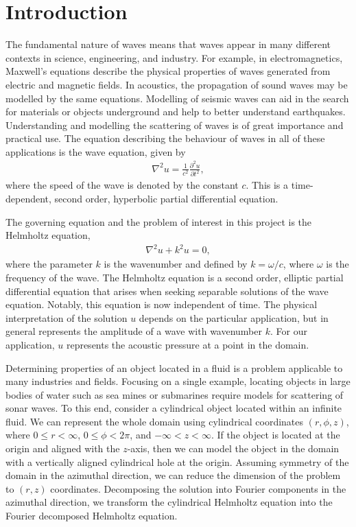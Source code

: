 \chapter{Introduction}


The fundamental nature of waves means that waves appear in many different contexts in science, engineering, and industry.
For example, in electromagnetics, Maxwell's equations describe the physical properties of waves generated from electric and magnetic fields.
In acoustics, the propagation of sound waves may be modelled by the same equations.
Modelling of seismic waves can aid in the search for materials or objects underground and help to better understand earthquakes.
Understanding and modelling the scattering of waves is of great importance and practical use.
The equation describing the behaviour of waves in all of these applications is the wave equation, given by
\begin{align}
	\nabla^2 u = \frac{1}{c^2}\frac{\partial^2 u}{\partial t^2}, \label{eqn:first}
\end{align}
where the speed of the wave is denoted by the constant $c$.
This is a time-dependent, second order, hyperbolic partial differential equation.

The governing equation and the problem of interest in this project is the Helmholtz equation,
\begin{align}
	\nabla^2 u + k^2 u = 0,
\end{align}
where the parameter $k$ is the wavenumber and defined by $k=\omega/c$, where $\omega$ is the frequency of the wave.
The Helmholtz equation is a second order, elliptic partial differential equation that arises when seeking separable solutions of the wave equation.
Notably, this equation is now independent of time.
The physical interpretation of the solution $u$ depends on the particular application, but in general represents the amplitude of a wave with wavenumber $k$.
For our application, $u$ represents the acoustic pressure at a point in the domain.

Determining properties of an object located in a fluid is a problem applicable to many industries and fields.
Focusing on a single example, locating objects in large bodies of water such as sea mines or submarines require models for scattering of sonar waves.
To this end, consider a cylindrical object located within an infinite fluid.
We can represent the whole domain using cylindrical coordinates $(r, \phi, z)$, where $0\leq r < \infty$, $0 \leq \phi < 2\pi$, and $-\infty < z < \infty$.
If the object is located at the origin and aligned with the $z$-axis, then we can model the object in the domain with a vertically aligned cylindrical hole at the origin.
Assuming symmetry of the domain in the azimuthal direction, we can reduce the dimension of the problem to $(r,z)$ coordinates.
Decomposing the solution into Fourier components in the azimuthal direction, we transform the cylindrical Helmholtz equation into the Fourier decomposed Helmholtz equation.


